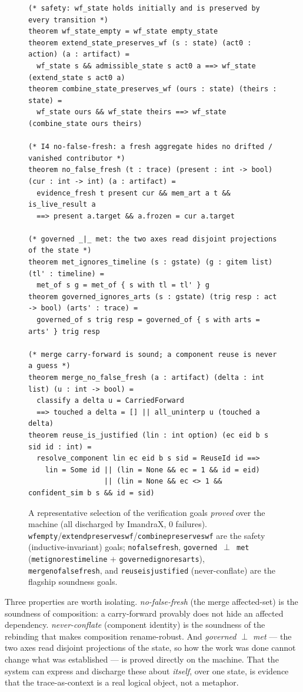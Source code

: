 \documentclass[11pt]{article}
\newcommand{\codeus}{\textunderscore\penalty100\relax}
\newcommand{\code}[1]{\texttt{\let\_\codeus #1}}
\begin{document}
\begin{figure}[H]
\begin{lstlisting}[language=IML]
(* safety: wf_state holds initially and is preserved by every transition *)
theorem wf_state_empty = wf_state empty_state
theorem extend_state_preserves_wf (s : state) (act0 : action) (a : artifact) =
  wf_state s && admissible_state s act0 a ==> wf_state (extend_state s act0 a)
theorem combine_state_preserves_wf (ours : state) (theirs : state) =
  wf_state ours && wf_state theirs ==> wf_state (combine_state ours theirs)

(* I4 no-false-fresh: a fresh aggregate hides no drifted / vanished contributor *)
theorem no_false_fresh (t : trace) (present : int -> bool) (cur : int -> int) (a : artifact) =
  evidence_fresh t present cur && mem_art a t && is_live_result a
  ==> present a.target && a.frozen = cur a.target

(* governed _|_ met: the two axes read disjoint projections of the state *)
theorem met_ignores_timeline (s : gstate) (g : gitem list) (tl' : timeline) =
  met_of s g = met_of { s with tl = tl' } g
theorem governed_ignores_arts (s : gstate) (trig resp : act -> bool) (arts' : trace) =
  governed_of s trig resp = governed_of { s with arts = arts' } trig resp

(* merge carry-forward is sound; a component reuse is never a guess *)
theorem merge_no_false_fresh (a : artifact) (delta : int list) (u : int -> bool) =
  classify a delta u = CarriedForward
  ==> touched a delta = [] || all_uninterp u (touched a delta)
theorem reuse_is_justified (lin : int option) (ec eid b s sid id : int) =
  resolve_component lin ec eid b s sid = ReuseId id ==>
    lin = Some id || (lin = None && ec = 1 && id = eid)
                  || (lin = None && ec <> 1 && confident_sim b s && id = sid)
\end{lstlisting}
\caption{A representative selection of the verification goals \emph{proved} over the machine (all discharged
by ImandraX, 0 failures). \code{wf\_empty}/\allowbreak\code{extend\_preserves\_wf}/\allowbreak\code{combine\_preserves\_wf} are the
safety (inductive-invariant) goals; \code{no\_false\_fresh}, \code{governed $\perp$ met}
(\code{met\_ignores\_timeline} $+$ \code{governed\_ignores\_arts}), \code{merge\_no\_false\_fresh}, and
\code{reuse\_is\_justified} (never-conflate) are the flagship soundness goals.}
\label{fig:machine-goals}
\end{figure}

Three properties are worth isolating. \emph{no-false-fresh} (the merge affected-set) is the soundness of
composition: a carry-forward provably does not hide an affected dependency. \emph{never-conflate} (component
identity) is the soundness of the rebinding that makes composition rename-robust. And \emph{governed $\perp$
met} --- the two axes read disjoint projections of the state, so how the work was done cannot change what
was established --- is proved directly on the machine. That the system can express and discharge these about
\emph{itself}, over one state, is evidence that the trace-as-context is a real logical object, not a
metaphor.
\end{document}

